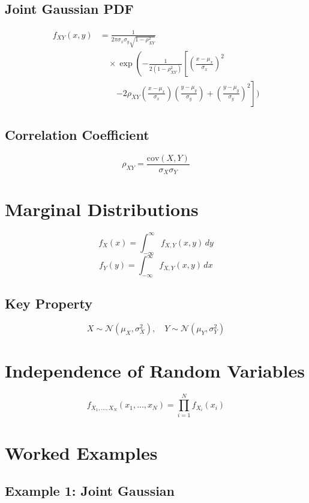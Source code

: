 \documentclass[12pt]{article}
\begin{document}
\subsection{Joint Gaussian PDF}
\[
\begin{aligned}
f_{XY}(x,y) &=
\frac{1}{2\pi \sigma_x \sigma_y \sqrt{1-\rho_{XY}^2}} \\
&\quad \times \exp \left(
-\frac{1}{2(1-\rho_{XY}^2)}
\left[
\left(\frac{x-\mu_x}{\sigma_x}\right)^2 \right.\right. \\
&\qquad \left.
- 2\rho_{XY}\left(\frac{x-\mu_x}{\sigma_x}\right)
\left(\frac{y-\mu_y}{\sigma_y}\right)
+ \left(\frac{y-\mu_y}{\sigma_y}\right)^2
\right] \Bigg)
\end{aligned}
\]

\subsection{Correlation Coefficient}
\[
\rho_{XY} = \frac{\text{cov}(X,Y)}{\sigma_X \sigma_Y}
\]

\section{Marginal Distributions}

\[
f_X(x) = \int_{-\infty}^{\infty} f_{X,Y}(x,y)\, dy
\]
\[
f_Y(y) = \int_{-\infty}^{\infty} f_{X,Y}(x,y)\, dx
\]

\subsection{Key Property}
\[
X \sim \mathcal{N}(\mu_X, \sigma_X^2), \quad
Y \sim \mathcal{N}(\mu_Y, \sigma_Y^2)
\]

\section{Independence of Random Variables}

\[
f_{X_1, \dots, X_N}(x_1, \dots, x_N)
= \prod_{i=1}^{N} f_{X_i}(x_i)
\]

\section{Worked Examples}

\subsection{Example 1: Joint Gaussian}
\end{document}
